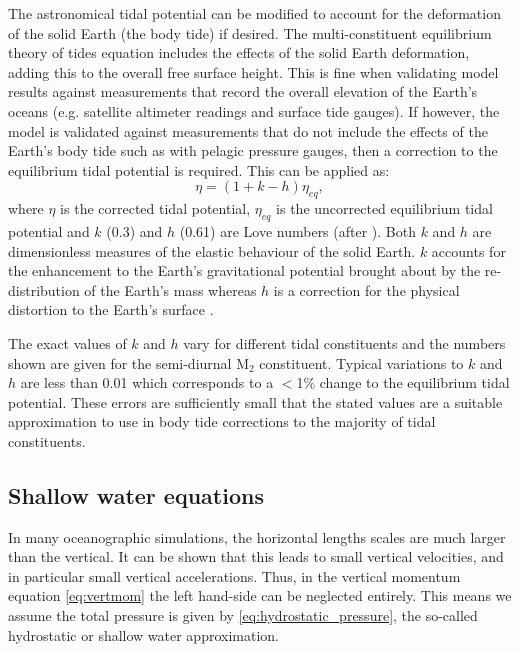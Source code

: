 The astronomical tidal potential can be modified to account for the deformation of the solid Earth
(the body tide) if desired. The multi-constituent equilibrium theory of tides equation includes the effects of the
solid Earth deformation, adding this to the overall free surface height. 
This is fine
when validating model results against measurements that record the overall elevation of the 
Earth's oceans (e.g. satellite altimeter readings and surface tide gauges). If however, the model
is validated against measurements that do not include the effects of the Earth's body tide
such as with pelagic pressure gauges, then a correction to the equilibrium tidal potential
is required. This can be applied as: 
\begin{equation}
\eta=(1+k-h)\eta_{eq},
\label{eq:body-tide}
\end{equation}    
where $\eta$ is the corrected tidal potential, $\eta_{eq}$ is the uncorrected equilibrium tidal potential
and $k$ (0.3) and $h$ (0.61) are Love numbers (after \citealp{Love1909}).
Both $k$ and $h$ are dimensionless measures of the elastic behaviour of the solid Earth. $k$ accounts for the enhancement to the
Earth's gravitational potential brought about by the re-distribution of the Earth's mass whereas $h$
is a correction for the physical distortion to the Earth's surface \citep{Pugh1987}.

The exact values of $k$ and $h$ vary for different tidal constituents and the numbers shown are given
for the semi-diurnal M$_{\text{2}}$ constituent. Typical variations to $k$ and $h$ are less than 0.01 which
corresponds to a $<$1\% change to the equilibrium tidal potential.
These errors are sufficiently small that the stated values are a suitable approximation to
use in body tide corrections to the majority of tidal constituents.

\subsection{Shallow water equations}
In many oceanographic simulations, the horizontal lengths scales are much larger
than the vertical. It can be shown that this leads to small vertical velocities,
and in particular small vertical accelerations. Thus, in the vertical momentum
equation \eqref{eq:vertmom} the left hand-side can be neglected entirely. This
means we assume the total pressure is given by \eqref{eq:hydrostatic_pressure},
the so-called hydrostatic or shallow water approximation.

